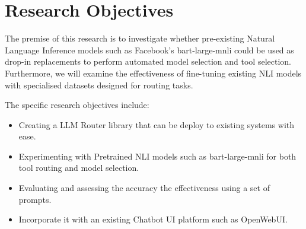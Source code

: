\section{Research Objectives}
\label{sec:intro_aims_obj}

The premise of this research is to investigate whether pre-existing Natural Language Inference models such as Facebook's bart-large-mnli could be used as drop-in replacements to perform automated model selection and tool selection. Furthermore, we will examine the effectiveness of fine-tuning existing NLI models with specialised datasets designed for routing tasks.

The specific research objectives include:
\begin{itemize}
    \item Creating a LLM Router library that can be deploy to existing systems with ease.
    \item Experimenting with Pretrained NLI models such as bart-large-mnli for both tool routing and model selection.
    \item Evaluating and assessing the accuracy the effectiveness using a set of prompts.
    \item Incorporate it with an existing Chatbot UI platform such as OpenWebUI.
\end{itemize}




